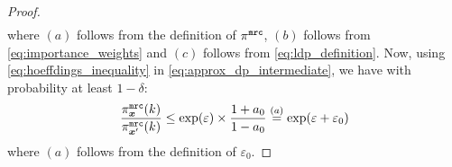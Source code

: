 \begin{proof}
\begin{align}
\end{align}
where $(a)$ follows from the definition of $\pi^{\texttt{mrc}}$, $(b)$ follows from \eqref{eq:importance_weights}
and $(c)$ follows from \eqref{eq:ldp_definition}. Now, using \eqref{eq:hoeffdings_inequality} in \eqref{eq:approx_dp_intermediate}, we have with probability at least $1-\delta$:
\begin{align}
    \frac{\pi^{\texttt{mrc}}_{{\boldsymbol{x}}}(k)}{\pi^{\texttt{mrc}}_{{\boldsymbol{x}}'}(k)} \leq \exp(\varepsilon) \times \frac{1+a_0}{1-a_0} \stackrel{(a)}{=} \exp(\varepsilon + \varepsilon_0)
\end{align}
 where $(a)$ follows from the definition of $\varepsilon_0$.
\end{proof}


